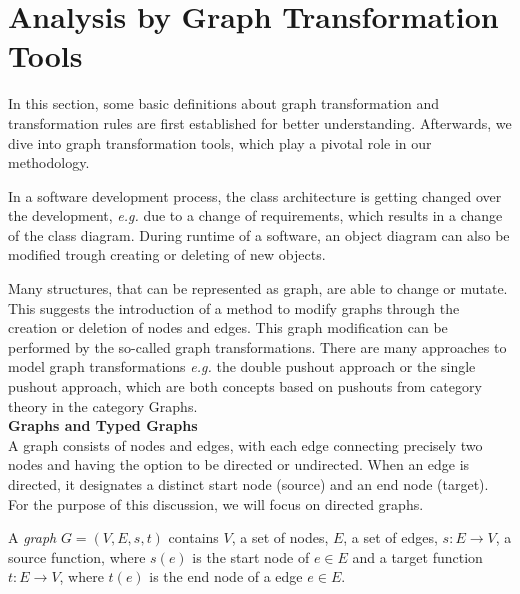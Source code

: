 \section{Analysis by Graph Transformation Tools}\label{gts}
In this section, some basic definitions about graph transformation and transformation rules are first established for better understanding. Afterwards, we dive into graph transformation tools, which play a pivotal role in our methodology. 

In a software development process, the class architecture is getting changed over the development, \emph{e.g.} due to a change of requirements, which results in a change of the class diagram. During runtime of a software, an object diagram can also be modified trough creating or deleting of new objects. 

Many structures, that can be represented as graph, are able to change or mutate. This suggests the introduction of a method to modify graphs through the creation or deletion of nodes and edges. This graph modification can be performed by the so-called graph transformations. There are many approaches to model graph transformations \emph{e.g.} the double pushout approach or the single pushout approach, which are both concepts based on pushouts from category theory in the category Graphs.\\ 
\textbf{Graphs and Typed Graphs}\\ 
A graph consists of nodes and edges, with each edge connecting precisely two nodes and having the option to be directed or undirected. When an edge is directed, it designates a distinct start node (source) and an end node (target). For the purpose of this discussion, we will focus on directed graphs.

\begin{definition}
\label{def_graph}
A \emph{graph} $G = (V,E,s,t)$ contains $V$, a set of nodes, $E$, a set of edges, $s: E \to V$, a source function, where $s(e)$ is the start node of $e \in E$ and a target function $t:E \to V$, where $t(e)$ is the end node of a edge $e \in E$.
\end{definition}

